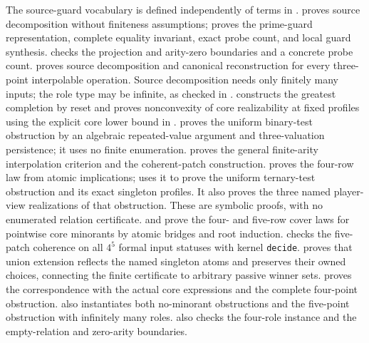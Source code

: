 The source-guard vocabulary is defined independently of terms in
.
 proves source decomposition without
finiteness assumptions;  proves the
prime-guard representation, complete equality invariant, exact probe count,
and local guard synthesis.  checks the
projection and arity-zero boundaries and a concrete probe count.
 proves source decomposition and
canonical reconstruction for every three-point interpolable operation.
Source decomposition needs only finitely many inputs; the role type may be
infinite, as checked in .
 constructs the greatest completion
by reset and proves nonconvexity of core realizability at fixed profiles using the explicit
core lower bound in .
 proves the uniform binary-test
obstruction by an algebraic repeated-value argument and three-valuation
persistence; it uses no finite enumeration.
 proves the general finite-arity
interpolation criterion and the coherent-patch construction.
 proves the four-row law from atomic
implications;  uses it to prove the
uniform ternary-test obstruction and its exact singleton profiles.
It also proves the three named player-view realizations of that obstruction.
These are symbolic proofs, with no enumerated relation certificate.
 and
 prove the four- and five-row cover laws
for pointwise core minorants by atomic bridges and root induction.
 checks the five-patch coherence
on all $4^5$ formal input statuses with kernel \texttt{decide}.
 proves that union extension reflects the
named singleton atoms and preserves their owned choices, connecting the finite
certificate to arbitrary passive winner sets.
 proves the correspondence with the
actual core expressions and the complete four-point obstruction.
 also instantiates both no-minorant
obstructions and the five-point obstruction with infinitely many roles.
 also checks the four-role instance
and the empty-relation and zero-arity boundaries.

